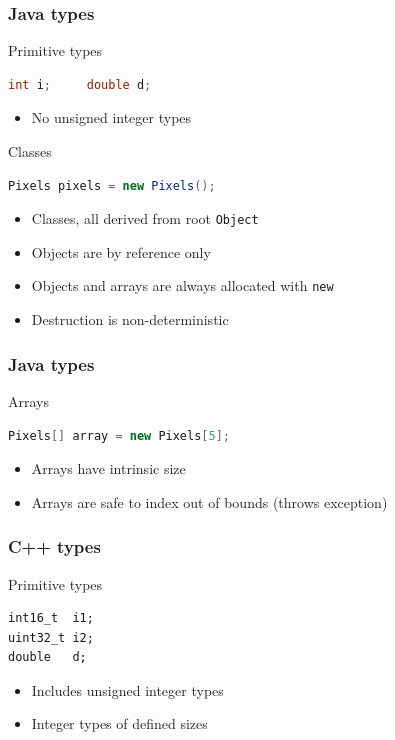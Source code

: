 \documentclass[handout]{beamer}
\begin{document}
\begin{frame}[fragile]
  \frametitle{Java types}

  \begin{block}{Primitive types}
    \begin{lstlisting}[language=Java]
int i;     double d;
\end{lstlisting}
    \begin{itemize}
      \pause
    \item No unsigned integer types
    \end{itemize}
  \end{block}
  \pause
  \begin{block}{Classes}
    \begin{lstlisting}[language=Java]
Pixels pixels = new Pixels();
\end{lstlisting}
    \begin{itemize}
      \pause
    \item Classes, all derived from root \texttt{Object}
      \pause
    \item Objects are by reference only
      \pause
    \item Objects and arrays are always allocated with \texttt{new}
      \pause
    \item Destruction is non-deterministic
    \end{itemize}
  \end{block}
\end{frame}

\begin{frame}[fragile]
  \frametitle{Java types}
  \begin{block}{Arrays}
    \begin{lstlisting}[language=Java]
Pixels[] array = new Pixels[5];
\end{lstlisting}
    \begin{itemize}
      \pause
    \item Arrays have intrinsic size
      \pause
    \item Arrays are safe to index out of bounds (throws exception)
    \end{itemize}
  \end{block}
\end{frame}

\begin{frame}[fragile]
  \frametitle{C++ types}
  \begin{block}{Primitive types}
    \begin{lstlisting}
int16_t  i1;
uint32_t i2;
double   d;
\end{lstlisting}
    \begin{itemize}
      \pause
    \item Includes unsigned integer types
      \pause
    \item Integer types of defined sizes
    \end{itemize}
  \end{block}
\end{frame}
\end{document}
